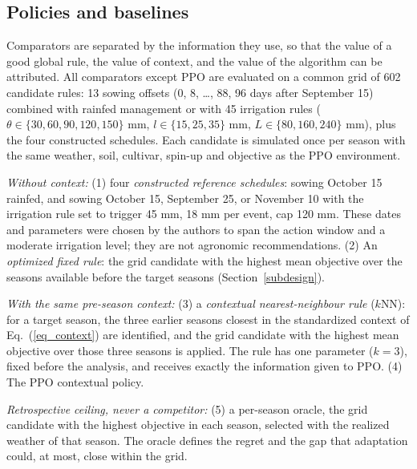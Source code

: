 \documentclass[times,final,authoryear]{elsarticle}
\begin{document}
\subsection{Policies and baselines}
\label{subbaselines}

Comparators are separated by the information they use, so that the value of a good global rule, the value of context, and the value of the algorithm can be attributed. All comparators except PPO are evaluated on a common grid of 602 candidate rules: 13 sowing offsets (0, 8, \dots, 88, 96 days after September 15) combined with rainfed management or with 45 irrigation rules ($\theta \in \{30, 60, 90, 120, 150\}$ mm, $l \in \{15, 25, 35\}$ mm, $L \in \{80, 160, 240\}$ mm), plus the four constructed schedules. Each candidate is simulated once per season with the same weather, soil, cultivar, spin-up and objective as the PPO environment.

\emph{Without context:} (1) four \emph{constructed reference schedules}: sowing October 15 rainfed, and sowing October 15, September 25, or November 10 with the irrigation rule set to trigger 45 mm, 18 mm per event, cap 120 mm. These dates and parameters were chosen by the authors to span the action window and a moderate irrigation level; they are not agronomic recommendations. (2) An \emph{optimized fixed rule}: the grid candidate with the highest mean objective over the seasons available before the target seasons (Section~\ref{subdesign}).

\emph{With the same pre-season context:} (3) a \emph{contextual nearest-neighbour rule} ($k$NN): for a target season, the three earlier seasons closest in the standardized context of Eq.~(\ref{eq_context}) are identified, and the grid candidate with the highest mean objective over those three seasons is applied. The rule has one parameter ($k = 3$), fixed before the analysis, and receives exactly the information given to PPO. (4) The PPO contextual policy.

\emph{Retrospective ceiling, never a competitor:} (5) a per-season oracle, the grid candidate with the highest objective in each season, selected with the realized weather of that season. The oracle defines the regret and the gap that adaptation could, at most, close within the grid.
\end{document}
